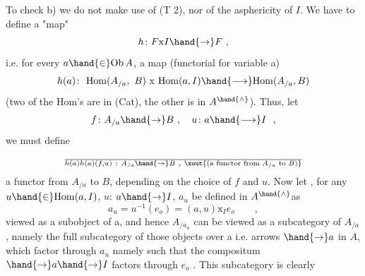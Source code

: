 To check b) we do not make use of  (T 2),  nor of the asphericity of
$I$.  We have to define a "map"
\[ h\colon F\mathrm{x}I\hand{\to} F\ , \]
i.e. for every $a\hand{\in}\mathrm{Ob}\,A$,  a map (functorial for variable a)
\[ h(a)\colon\ \mathrm{Hom}(A_{/a},\ B)\ \mathrm{x}\ \mathrm{Hom}(a,I)\hand{\longrightarrow} \mathrm{Hom}(A_{/a},B) \]
(two of the Hom's are in (Cat), the other is in $A^{\hand{\wedge}}$).  Thus,  let
\[ f\colon A_{/a}\hand{\to} B\ ,\quad u\colon a\hand{\longrightarrow} I\ \ , \]
we must define
\[ \over{h(a)}{h(a)}(f,u)\ :\ A_{/a}\hand{\to} B\ ,\ \xout{\text{(a functor from }A_{/a}\text{ to }B)} \]
a functor from $A_{/a}$ to $B$,  depending on the choice of $f$ and $u$.  Now let ,
for any  $u\hand{\in}\mathrm{Hom}(a,I)$,  $u$: $a\hand{\to} I$,  $a_u$ be defined in $A^{\hand{\wedge}}$\hand{/}as
\[ a_u = u^{-1}(e_o) = (a,u)\mathrm{x}_I e_o\qquad , \]
viewed as a subobject of a,  and hence $A_{/a_u}$  can be viewed as a subcategory
of $A_{/a}$ ,  namely the  full subcategory of those  objects  over a
i.e. arrows $\hand{\to} a$ in $A$,  which factor through $a_u$ namely such that the
compositum  $\hand{\to} a\hand{\to} I$  factors through $e_o$ .  This subcategory is clearly
